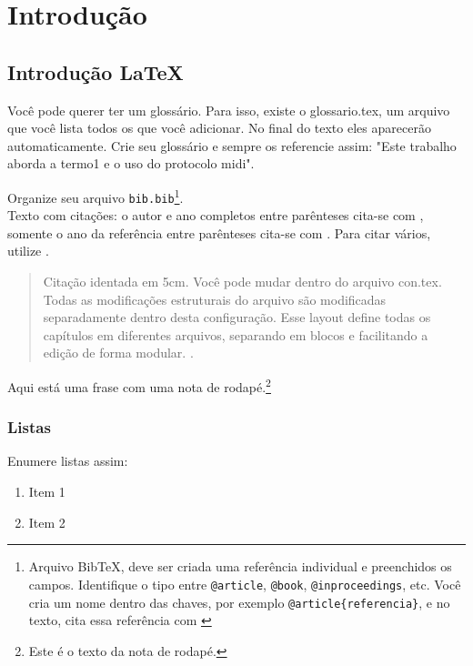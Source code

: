 \setlength{\parskip}{1.5pt}

\chapter[Introdução]{Introdução}

\section{Introdução \LaTeX}
Você pode querer ter um glossário. Para isso, existe o glossario.tex, um arquivo que você lista todos os que você adicionar. No final do texto eles aparecerão automaticamente. Crie seu glossário e sempre os referencie assim: "Este trabalho aborda a \gls{termo1} e o uso do protocolo \gls{midi}".


Organize seu arquivo \texttt{bib.bib}\footnote{Arquivo BibTeX, deve ser criada uma referência individual e preenchidos os campos. Identifique o tipo entre \texttt{@article}, \texttt{@book}, \texttt{@inproceedings}, etc. Você cria um nome dentro das chaves, por exemplo \texttt{@article\{referencia\}}, e no texto, cita essa referência com \cite{referencia}}. \\ 
Texto com citações: o autor e ano completos entre parênteses cita-se com \cite{article}, somente o ano da referência entre parênteses cita-se com \citeyear{capitulo}. Para citar vários, utilize \parencite{book, congresso, tese, site, manual, relatoriotecnico, naopublicado}.


\vspace{1.5em} %


\begin{quote}
    Citação identada em 5cm. Você pode mudar dentro do arquivo con.tex. Todas as modificações estruturais do arquivo são modificadas separadamente dentro desta configuração. Esse layout define todas os capítulos em diferentes arquivos, separando em blocos e facilitando a edição de forma modular. \cite[p. 00-00]{capitulo}.
\end{quote}

Aqui está uma frase com uma nota de rodapé.\footnote{Este é o texto da nota de rodapé.}



\subsection{Listas}
Enumere listas assim:
\begin{enumerate}
    \item Item 1
    \item Item 2
\end{enumerate}


